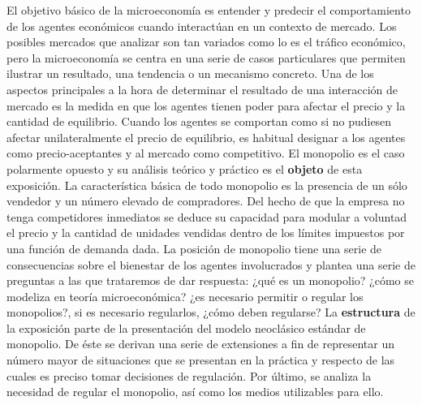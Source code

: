 \documentclass{nuevotema}
\begin{document}
\ideaclave

El objetivo básico de la microeconomía es entender y predecir el comportamiento de los agentes económicos cuando interactúan en un contexto de mercado. Los posibles mercados que analizar son tan variados como lo es el tráfico económico, pero la microeconomía se centra en una serie de casos particulares que permiten ilustrar un resultado, una tendencia o un mecanismo concreto. Una de los aspectos principales a la hora de determinar el resultado de una interacción de mercado es la medida en que los agentes tienen poder para afectar el precio y la cantidad de equilibrio. Cuando los agentes se comportan como si no pudiesen afectar unilateralmente el precio de equilibrio, es habitual designar a los agentes como precio-aceptantes y al mercado como competitivo. El monopolio es el caso polarmente opuesto y su análisis teórico y práctico es el \textbf{objeto} de esta exposición. La característica básica de todo monopolio es la presencia de un sólo vendedor y un número elevado de compradores. Del hecho de que la empresa no tenga competidores inmediatos se deduce su capacidad para modular a voluntad el precio y la cantidad de unidades vendidas dentro de los límites impuestos por una función de demanda dada. La posición de monopolio tiene una serie de consecuencias sobre el bienestar de los agentes involucrados y plantea una serie de preguntas a las que trataremos de dar respuesta: ¿qué es un monopolio? ¿cómo se modeliza en teoría microeconómica? ¿es necesario permitir o regular los monopolios?, si es necesario regularlos, ¿cómo deben regularse? La \textbf{estructura} de la exposición parte de la presentación del modelo neoclásico estándar de monopolio. De éste se derivan una serie de extensiones a fin de representar un número mayor de situaciones que se presentan en la práctica y respecto de las cuales es preciso tomar decisiones de regulación. Por último, se analiza la necesidad de regular el monopolio, así como los medios utilizables para ello.
\end{document}

